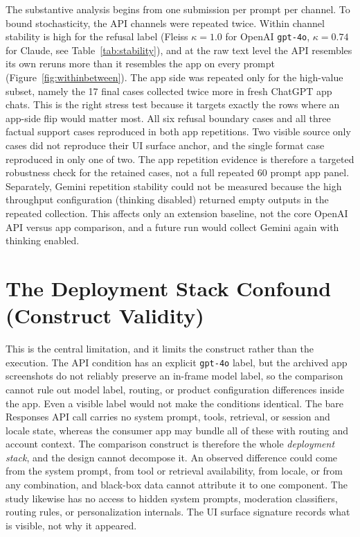 The substantive analysis begins from one submission per prompt per channel. To
bound stochasticity, the API channels were repeated twice. Within channel
stability is high for the refusal label (Fleiss $\kappa=1.0$ for OpenAI
\texttt{gpt-4o}, $\kappa=0.74$ for Claude, see Table~\ref{tab:stability}), and at
the raw text level the API resembles its own reruns more than it resembles the
app on every prompt (Figure~\ref{fig:withinbetween}). The app side was repeated
only for the high-value subset, namely the 17 final cases collected twice more in fresh
ChatGPT app chats. This is the right stress test because it targets exactly the
rows where an app-side flip would matter most. All six refusal boundary cases and
all three factual support cases reproduced in both app repetitions. Two
visible source only cases did not reproduce their UI surface anchor, and the
single format case reproduced in only one of two. The app repetition evidence is
therefore a targeted robustness check for the retained cases, not a full repeated
60 prompt app panel. Separately, Gemini repetition stability could not be measured
because the high throughput configuration (thinking disabled) returned empty
outputs in the repeated collection. This affects only an extension baseline, not
the core
OpenAI API versus app comparison, and a future run would collect Gemini again with
thinking enabled.

\section{The Deployment Stack Confound (Construct Validity)}

This is the central limitation, and it limits the construct rather than the
execution. The API condition has an explicit \texttt{gpt-4o} label, but the
archived app screenshots do not reliably preserve an in-frame model label, so the
comparison cannot rule out model label, routing, or product configuration
differences inside the app. Even a visible label would not make the conditions
identical. The bare Responses API call carries no system prompt, tools, retrieval,
or session and locale state, whereas the consumer app may bundle all of these with
routing and account context. The comparison construct is therefore the whole
\emph{deployment stack}, and the design cannot decompose it. An observed
difference could come from the system prompt, from tool or retrieval availability,
from locale, or from any combination, and black-box data cannot attribute it to one
component. The study likewise has no access to hidden system prompts, moderation
classifiers, routing rules, or personalization internals. The UI surface signature
records what is visible, not why it appeared.

